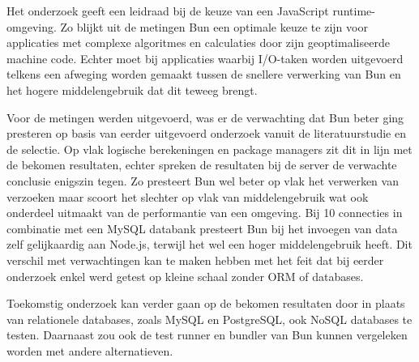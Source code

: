 Het onderzoek geeft een leidraad bij de keuze van een JavaScript runtime-omgeving.
Zo blijkt uit de metingen Bun een optimale keuze te zijn voor applicaties met complexe algoritmes en calculaties door zijn geoptimaliseerde machine code.
Echter moet bij applicaties waarbij I/O-taken worden uitgevoerd telkens een afweging worden gemaakt tussen de snellere verwerking van Bun en het hogere middelengebruik dat dit teweeg brengt.


Voor de metingen werden uitgevoerd, was er de verwachting dat Bun beter ging presteren op basis van eerder uitgevoerd onderzoek vanuit de literatuurstudie en de selectie.
Op vlak logische berekeningen en package managers zit dit in lijn met de bekomen resultaten, echter spreken de resultaten bij de server de verwachte conclusie enigszin tegen.
Zo presteert Bun wel beter op vlak het verwerken van verzoeken maar scoort het slechter op vlak van middelengebruik wat ook onderdeel uitmaakt van de performantie van een omgeving.
Bij 10 connecties in combinatie met een MySQL databank presteert Bun bij het invoegen van data zelf gelijkaardig aan Node.js, terwijl het wel een hoger middelengebruik heeft.
Dit verschil met verwachtingen kan te maken hebben met het feit dat bij eerder onderzoek enkel werd getest op kleine schaal zonder ORM of databases.

Toekomstig onderzoek kan verder gaan op de bekomen resultaten door in plaats van relationele databases, zoals MySQL en PostgreSQL, ook NoSQL databases te testen.
Daarnaast zou ook de test runner en bundler van Bun kunnen vergeleken worden met andere alternatieven.

